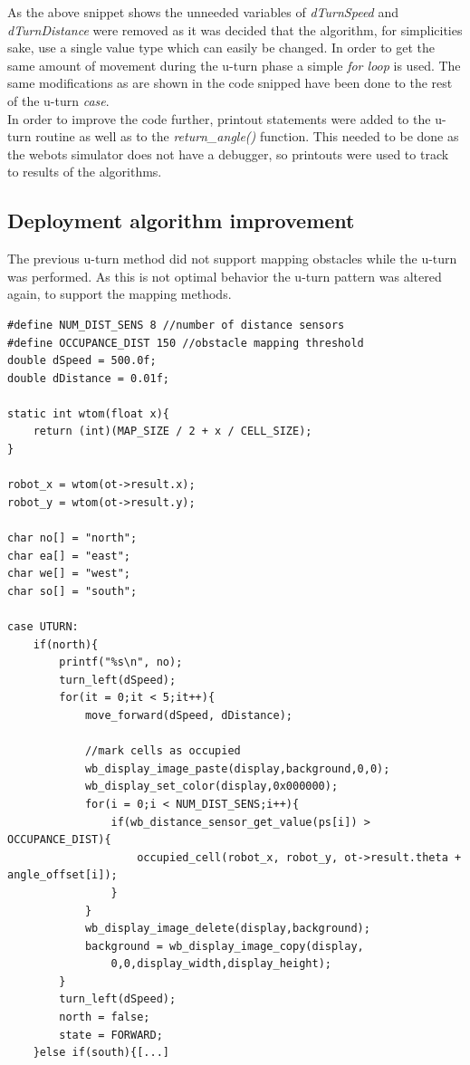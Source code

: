 As the above snippet shows the unneeded variables of \textit{dTurnSpeed} and \textit{dTurnDistance} were removed as it was decided that the algorithm, for simplicities sake, use a single value type which can easily be changed. In order to get the same amount of movement during the u-turn phase a simple \textit{for loop} is used. The same modifications as are shown in the code snipped have been done to the rest of the u-turn \textit{case}. \\
In order to improve the code further, printout statements were added to the u-turn routine as well as to the \textit{return\_angle()} function.
This needed to be done as the webots simulator does not have a debugger, so printouts were used to track to results of the algorithms.

\subsection{Deployment algorithm improvement}
\label{deployment_improvement}
The previous u-turn method did not support mapping obstacles while the u-turn was performed. As this is not optimal behavior the u-turn pattern was altered again, to support the mapping methods.

\begin{lstlisting}[caption={U-turn improved with obstacle detection and mapping}, label={uturn_code}]
#define NUM_DIST_SENS 8 //number of distance sensors
#define OCCUPANCE_DIST 150 //obstacle mapping threshold
double dSpeed = 500.0f;
double dDistance = 0.01f;

static int wtom(float x){
    return (int)(MAP_SIZE / 2 + x / CELL_SIZE);
}

robot_x = wtom(ot->result.x);
robot_y = wtom(ot->result.y);

char no[] = "north";
char ea[] = "east";
char we[] = "west";
char so[] = "south";

case UTURN:
    if(north){
        printf("%s\n", no);
        turn_left(dSpeed);
        for(it = 0;it < 5;it++){
            move_forward(dSpeed, dDistance);
            
            //mark cells as occupied
            wb_display_image_paste(display,background,0,0);
            wb_display_set_color(display,0x000000);
            for(i = 0;i < NUM_DIST_SENS;i++){
                if(wb_distance_sensor_get_value(ps[i]) > OCCUPANCE_DIST){
                    occupied_cell(robot_x, robot_y, ot->result.theta + angle_offset[i]);
                }
            }
            wb_display_image_delete(display,background);
            background = wb_display_image_copy(display,
                0,0,display_width,display_height);
        }
        turn_left(dSpeed);
        north = false;
        state = FORWARD;
    }else if(south){[...]
\end{lstlisting}

